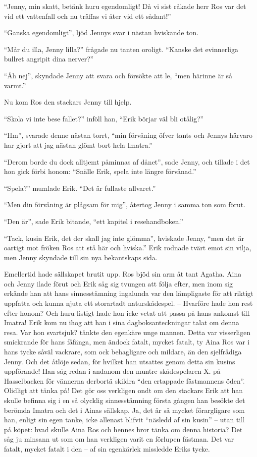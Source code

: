 ``Jenny, min skatt, betänk huru egendomligt! Då vi sist råkade herr Ros
var det vid ett vattenfall och nu träffas vi åter vid ett sådant!''

``Ganska egendomligt'', ljöd Jennys svar i nästan hviskande ton.

``Mår du illa, Jenny lilla?'' frågade nu tanten oroligt. ``Kanske det
evinnerliga bullret angripit dina nerver?''

``Åh nej'', skyndade Jenny att svara och försökte att le, ``men härinne
är så varmt.''

Nu kom Ros den stackars Jenny till hjelp.

``Skola vi inte bese fallet?'' inföll han, ``Erik börjar väl bli
otålig?''

``Hm'', svarade denne nästan torrt, ``min förvåning öfver tants och
Jennys härvaro har gjort att jag nästan glömt bort hela Imatra.''

``Derom borde du dock alltjemt påminnas af dånet'', sade Jenny, och
tillade i det hon gick förbi honom: ``Snälle Erik, spela inte längre
förvånad.''

``Spela?'' mumlade Erik. ``Det är fullaste allvaret.''

``Men din förvåning är plågsam för mig'', återtog Jenny i samma ton som
förut.

``Den är'', sade Erik bitande, ``ett kapitel i resehandboken.''

``Tack, kusin Erik, det der skall jag inte glömma'', hviskade Jenny,
``men det är oartigt mot fröken Ros att stå här och hviska.'' Erik
rodnade tvärt emot sin vilja, men Jenny skyndade till sin nya
bekantskaps sida.

Emellertid hade sällskapet brutit upp. Ros bjöd sin arm åt tant Agatha.
Aina och Jenny ilade förut och Erik såg sig tvungen att följa efter, men
inom sig erkände han att hans sinnesstämning ingalunda var den
lämpligaste för att riktigt uppfatta och kunna njuta ett storartadt
naturskådespel. -- Hvarföre hade hon rest efter honom? Och huru listigt
hade hon icke vetat att passa på hans ankomst till Imatra! Erik kom nu
ihog att han i sina dagboksanteckningar talat om denna resa. Var hon
svartsjuk? tänkte den egenkäre unge mannen. Detta var visserligen
smickrande för hans fåfänga, men ändock fatalt, mycket fatalt, ty Aina
Ros var i hans tycke såväl vackrare, som ock behagligare och mildare, än
den sjelfrådiga Jenny. Och det åtlöje sedan, för hvilket han utsattes
genom detta sin kusins uppförande! Han såg redan i andanom den muntre
skådespelaren X. på Hasselbacken för vännerna derbortä skildra ``den
ertappade fästmannens öden''. Olidligt att tänka på! Det gör oss
verkligen ondt om den stackars Erik att han skulle befinna sig i en så
olycklig sinnesstämning första gången han besökte det berömda Imatra och
det i Ainas sällskap. Ja, det är så mycket förargligare som han, enligt
sin egen tanke, icke allenast blifvit ``näsledd af sin kusin'' -- utan
till på köpet: hvad skulle Aina Ros och hennes bror tänka om denna
historia? Det såg ju minsann ut som om han verkligen varit en förlupen
fästman. Det var fatalt, mycket fatalt i den -- af sin egenkärlek
missledde Eriks tycke.

